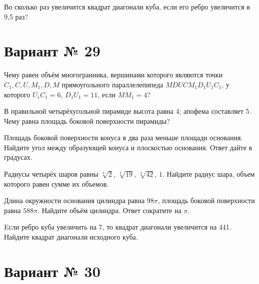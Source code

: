 \documentclass[4apaper]{article}
\begin{document}
\begin{taskBN}{6}
Во сколько раз увеличится квадрат диагонали куба, если его ребро увеличится в 9,5 раз?
\end{taskBN}
\newpage\section*{Вариант № 29}

\begin{taskBN}{1}
Чему равен объём многогранника, вершинами которого являются точки $C_1,C,U,M_1,D,M$ прямоугольного параллелепипеда $MDUCM_1D_1U_1C_1$, у которого $U_1C_1 = 6$, $D_1U_1 = 11$, если $MM_1=4$? 
\end{taskBN}

\begin{taskBN}{2}
В правильной четырёхугольной пирамиде высота равна 4; апофема составляет 5. Чему равна площадь боковой поверхности пирамиды?
\end{taskBN}

\begin{taskBN}{3}
Площадь боковой поверхности конуса в два раза меньше площади основания. Найдите угол между образующей конуса и плоскостью основания. Ответ дайте в градусах.
\end{taskBN}

\begin{taskBN}{4}
Радиусы четырёх шаров равны $\sqrt[3]{2}$, $\sqrt[3]{19}$, $\sqrt[3]{42}$, $1$. Найдите радиус шара, объем которого равен сумме их объемов.
\end{taskBN}

\begin{taskBN}{5}
Длина окружности основания цилиндра равна $98\pi$, площадь боковой поверхности равна $588\pi$. Найдите объём цилиндра. Ответ сократите на $\pi$.
\end{taskBN}

\begin{taskBN}{6}
Eсли ребро куба увеличить на 7, то квадрат диагонали увеличится на 441. Найдите квадрат диагонали исходного куба.
\end{taskBN}
\newpage\section*{Вариант № 30}
\end{document}
